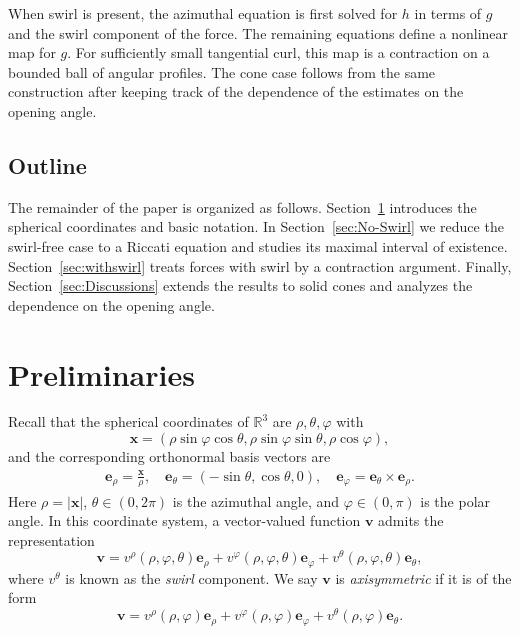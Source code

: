 \documentclass{amsart}
\newcommand{\te}{\theta}
\newcommand{\vp}{\varphi}
\newcommand{\Bv}{{\boldsymbol{v}}}
\newcommand{\Be}{{\boldsymbol{e}}}
\newcommand{\Bx}{{\boldsymbol{x}}}
\newcommand{\R}{\mathbb{R}}
\begin{document}
When swirl is present, the azimuthal equation is first solved for
$h$ in terms of $g$ and the swirl component of the force. The
remaining equations define a nonlinear map for $g$. For sufficiently
small tangential curl, this map is a contraction on a bounded ball
of angular profiles. The cone case follows from the same construction
after keeping track of the dependence of the estimates on the
opening angle.


\subsection{Outline} 
The remainder of the paper is organized as follows.  
Section~\ref{sec:Pre} introduces the  spherical coordinates and basic notation.  
In Section~\ref{sec:No-Swirl} we reduce the swirl-free case to a Riccati equation and studies its maximal interval of existence.  
Section~\ref{sec:withswirl} treats forces with swirl by a contraction argument.  
Finally, Section~\ref{sec:Discussions} extends the results to solid cones and analyzes the dependence on the opening angle.



\section{Preliminaries}\label{sec:Pre}
Recall that the spherical coordinates of $\R^3$ are $\rho,\te,\vp$ with 
\[
\Bx=(\rho\sin \vp \cos \te,\rho \sin \vp \sin \te, \rho \cos \vp ),
\]
and the corresponding orthonormal basis vectors are
\begin{align} \label{eqn:sphericalbasis}
\Be_{\rho}=\frac{\Bx}{\rho}, \quad \Be_{\te}=(-\sin \te, \cos \te,0), \quad \Be_{\vp}=\Be_{\te}\times \Be_{\rho}.
\end{align}
Here $\rho=|\Bx|$, $\te \in (0,2\pi)$ is the azimuthal angle, and $\vp\in (0,\pi)$ is the polar angle.
In this coordinate system, a vector-valued function $\Bv$ admits the representation
\begin{equation}\label{eqn:sphericalrep}
\Bv = v^\rho(\rho,\vp,\te) \Be_\rho + v^\vp(\rho,\vp,\te) \Be_\vp + v^\te(\rho,\vp,\te) \Be_\te, 
\end{equation}
where $v^\theta$ is known as the {\it swirl} component. We say $\Bv$ is {\it axisymmetric} if it is of the form
\[
\Bv = v^\rho(\rho,\vp) \Be_\rho + v^\vp(\rho,\vp) \Be_\vp + v^\te(\rho,\vp) \Be_\te. 
\]
\end{document}
